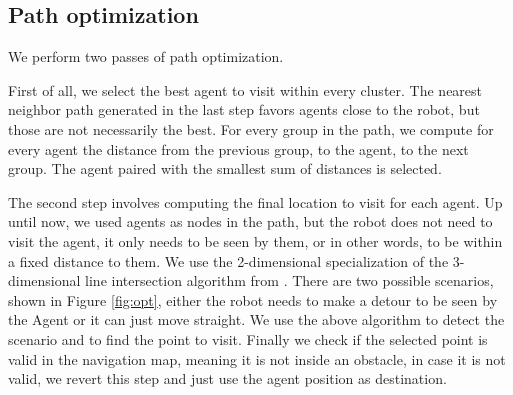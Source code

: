 \documentclass[]{article}
\begin{document}
\subsection{Path optimization}
We perform two passes of path optimization.

First of all, we select the best agent to visit within every cluster. The nearest neighbor path generated in the last step favors agents close to the robot, but those are not necessarily the best. For every group in the path, we compute for every agent the distance from the previous group, to the agent, to the next group. The agent paired with the smallest sum of distances is selected.

The second step involves computing the final location to visit for each agent. Up until now, we used agents as nodes in the path, but the robot does not need to visit the agent, it only needs to be seen by them, or in other words, to be within a fixed distance to them. We use the 2-dimensional specialization of the 3-dimensional line intersection algorithm from \cite{Goldman:1990:ITL:90767.90838}. There are two possible scenarios, shown in Figure \ref{fig:opt}, either the robot needs to make a detour to be seen by the Agent or it can just move straight. We use the above algorithm to detect the scenario and to find the point to visit. Finally we check if the selected point is valid in the navigation map, meaning it is not inside an obstacle, in case it is not valid, we revert this step and just use the agent position as destination.
\end{document}
